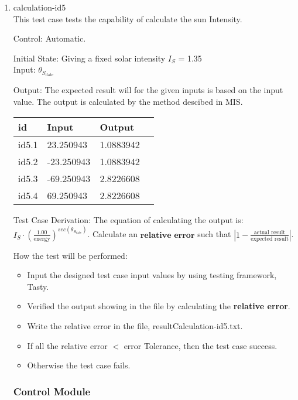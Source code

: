 \documentclass[12pt, titlepage]{article}
\begin{document}
\begin{enumerate}
\item{calculation-id5\\} 
This test case tests the capability of calculate the sun Intensity.

Control: Automatic. 

Initial State: Giving a fixed solar intensity $I_{S}$  =  1.35 \\
Input: $\theta_{S_{\text{date}}}$ 


Output: The expected result will for the given inputs is based on the input value.
The output is calculated by the method descibed in MIS. 

\noindent \begin{tabular}{l l l l} 
    \toprule		
    \textbf{id} & \textbf{Input} & \textbf{Output}\\ 
	\midrule
   id5.1 &  23.250943  & 1.0883942\\
   id5.2 & -23.250943  & 1.0883942\\
   id5.3 & -69.250943  & 2.8226608\\
   id5.4 &  69.250943  & 2.8226608\\
    \bottomrule
  \end{tabular}

Test Case Derivation: The equation of calculating the output is:\\
$I_{S} \cdot (\frac{1.00}{\text{energy}})^{sec(\theta_{S_{\text{date}}})} $. Calculate an $\textbf{relative error}$ such that $| 1 - \frac{\text{actual result}}{ \text{expected result}} |$.


How the test will be performed:

\begin{itemize} 
\item Input the designed test case input values by using testing framework, Tasty. 
\item Verified the output showing in the file by calculating the \textbf{relative error}.
\item Write the relative error in the file, resultCalculation-id5.txt.
\item If all the relative error $<$ error Tolerance, then the test case success.
\item Otherwise the test case fails.
\end{itemize}

\subsubsection{Control Module} 


\end{enumerate}
\end{document}
